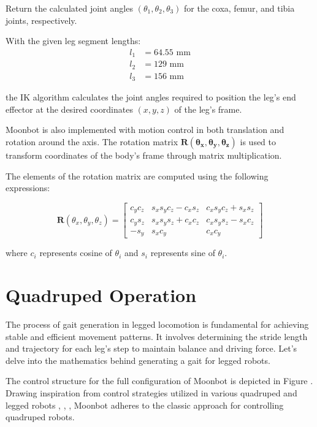 Return the calculated joint angles $(\theta_1, \theta_2, \theta_3)$ for the coxa, femur, and tibia joints, respectively. 


With the given leg segment lengths:
\begin{align}
  l_1 &= 64.55 \text{ mm} \\
  l_2 &= 129 \text{ mm} \\
  l_3 &= 156 \text{ mm}
\end{align}

the IK algorithm calculates the joint angles required to position the leg's end effector at the desired coordinates $(x, y, z)$ of the leg's frame.

Moonbot is also implemented with motion control in both translation and rotation around the axis. The rotation matrix $\mathbf{R(\theta_x, \theta_y, \theta_z)}$ is used to transform coordinates of the body's frame through matrix multiplication.

The elements of the rotation matrix are computed using the following expressions:

\vspace{2mm}
\begin{equation}
\mathbf{R}(\theta_x, \theta_y, \theta_z) = 
\begin{bmatrix}
c_ yc_z & s_x s_y c_z - c_x s_z & c_x s_y c_z + s_x s_z \\
c_y s_z & s_x s_y s_z + c_x c_z & c_x s_y s_z - s_x c_z \\
-s_y & s_x c_y & c_x c_y
\end{bmatrix}
\end{equation}
\vspace{2mm}

where $c_i$ represents cosine of $\theta_i$ and $s_i$ represents sine of $\theta_i$.

\section{Quadruped Operation}
The process of gait generation in legged locomotion is fundamental for achieving stable and efficient movement patterns. It involves determining the stride length and trajectory for each leg's step to maintain balance and driving force. Let's delve into the mathematics behind generating a gait for legged robots.

The control structure for the full configuration of Moonbot is depicted in Figure . Drawing inspiration from control strategies utilized in various quadruped and legged robots \cite{syropod}, \cite{uno2021hubrobo}, \cite{hyperdog}, Moonbot adheres to the classic approach for controlling quadruped robots.

